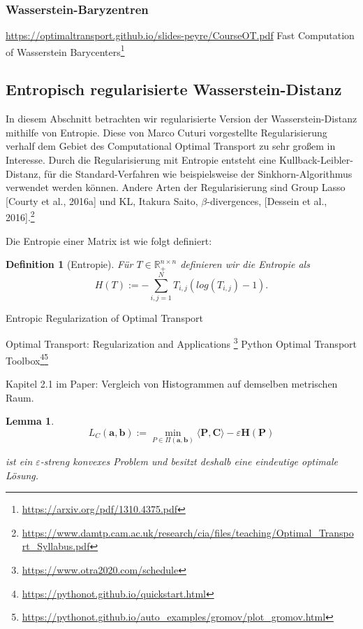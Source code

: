 \documentclass[11pt,a4paper]{article}
\newtheorem{lemma}[theorem]{Lemma}
\newtheorem{definition}[theorem]{Definition}
\numberwithin{equation}{section}
\begin{document}
	\subsubsection{Wasserstein-Baryzentren}
	\cite{bary_wasserstein_space}
	\url{https://optimaltransport.github.io/slides-peyre/CourseOT.pdf}
	Fast Computation of Wasserstein Barycenters\footnote{\url{https://arxiv.org/pdf/1310.4375.pdf}}
	
	\subsection{Entropisch regularisierte Wasserstein-Distanz}
	In diesem Abschnitt betrachten wir regularisierte Version der Wasserstein-Distanz mithilfe von Entropie. 
	Diese von Marco Cuturi vorgestellte Regularisierung \cite{cuturi2013sinkhorn} verhalf dem Gebiet des Computational Optimal Transport zu sehr großem in Interesse. Durch die Regularisierung mit Entropie entsteht eine Kullback-Leibler-Distanz, für die Standard-Verfahren wie beispielsweise der Sinkhorn-Algorithmus verwendet werden können.
	Andere Arten der Regularisierung sind Group Lasso [Courty et al., 2016a] und KL, Itakura Saito, $\beta$-divergences,
	[Dessein et al., 2016].\footnote{\url{https://www.damtp.cam.ac.uk/research/cia/files/teaching/Optimal_Transport_Syllabus.pdf}}
	
	Die Entropie einer Matrix ist wie folgt definiert:
	
	\begin{definition}[Entropie]
		Für $T \in \mathbb{R}_{+}^{n \times n}$ definieren wir die Entropie als
		\begin{equation}
		H(T) := - \sum_{i,j=1}^N{T_{i,j}(log(T_{i,j})-1)}.
		\end{equation}
	\end{definition}
	Entropic Regularization of Optimal Transport \cite{computationalOT}
	
	
	Optimal Transport: Regularization and Applications
	\footnote{\url{https://www.otra2020.com/schedule}}
	Python Optimal Transport Toolbox\footnote{\url{https://pythonot.github.io/quickstart.html}}\footnote{\url{https://pythonot.github.io/auto_examples/gromov/plot_gromov.html}}
	
	Kapitel 2.1 im Paper: Vergleich von Histogrammen auf demselben metrischen Raum.
	
	\begin{lemma}
		\begin{equation}
		L_C(\boldsymbol{a}, \boldsymbol{b}):= \min_{P \in \Pi(\boldsymbol{a}, \boldsymbol{b})}{\langle \boldsymbol{P}, \boldsymbol{C} \rangle - \varepsilon \boldsymbol{H}(\boldsymbol{P})}\label{eq:reg_problem}	
		\end{equation}
		
		
		ist ein $\varepsilon$-streng konvexes Problem und besitzt deshalb eine eindeutige optimale Lösung.
		
	\end{lemma}
	
\end{document}
